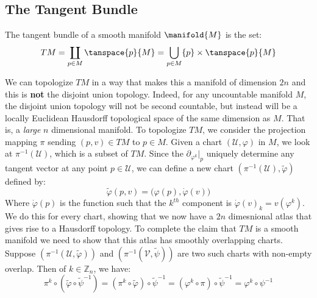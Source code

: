     \subsection{The Tangent Bundle}
        \begin{definition}
            The tangent bundle of a smooth manifold $\manifold{M}$ is the
            set:
            \begin{equation}
                TM=\coprod_{p\in{M}}\tanspace{p}{M}
                    =\bigcup_{p\in{M}}\{p\}\times\tanspace{p}{M}
            \end{equation}
        \end{definition}
        We can topologize $TM$ in a way that makes this a manifold of
        dimension $2n$ and this is \textbf{not} the disjoint union topology.
        Indeed, for any uncountable manifold $M$, the disjoint union
        topology will not be second countable, but instead will be a
        locally Euclidean Hausdorff topological space of the same dimension
        as $M$. That is, a \textit{large} $n$ dimensional manifold. To
        topologize $TM$, we consider the projection mapping $\pi$ sending
        $(p,v)\in{TM}$ to $p\in{M}$. Given a chart $(\mathcal{U},\varphi)$
        in $M$, we look at $\pi^{\minus{1}}(\mathcal{U})$, which is a
        subset of $TM$. Since the $\partial_{\varphi^{k}}|_{p}$ uniquely
        determine any tangent vector at any point $p\in\mathcal{U}$, we can
        define a new chart $(\pi^{\minus{1}}(\mathcal{U}),\tilde{\varphi})$
        defined by:
        \begin{equation}
            \tilde{\varphi}(p,v)=\big(\varphi(p),\dot{\varphi}(v)\big)
        \end{equation}
        Where $\dot{\varphi}(p)$ is the function such that the $k^{th}$
        component is $\dot{\varphi}(v)_{k}=v(\varphi^{k})$. We do this for
        every chart, showing that we now have a $2n$ dimesnional atlas that
        gives rise to a Hausdorff topology. To complete the claim that $TM$
        is a smooth manifold we need to show that this atlas has smoothly
        overlapping charts. Suppose
        $(\pi^{\minus{1}}(\mathcal{U},\tilde{\varphi}))$ and
        $(\pi^{\minus{1}}(\mathcal{V},\tilde{\psi}))$ are two such charts
        with non-empty overlap. Then of $k\in\mathbb{Z}_{n}$, we have:
        \begin{equation}
            \pi^{k}\circ(\tilde{\varphi}\circ\tilde{\psi}^{\minus{1}})
            =(\pi^{k}\circ\tilde{\varphi})\circ\tilde{\psi}^{\minus{1}}
            =(\varphi^{k}\circ\pi)\circ\tilde{\psi}^{\minus{1}}
            =\varphi^{k}\circ\psi^{\minus{1}}
        \end{equation}

